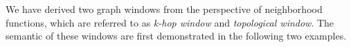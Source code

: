  
%

We have derived two graph windows from the perspective of neighborhood functions, 
which are referred to as \emph{k-hop window} and \emph{topological window}. 
The semantic of these windows are first demonstrated in the following two examples.



